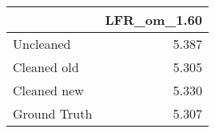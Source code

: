 \begin{tabular}{lr}
\toprule
{} & LFR_om_1.60 \\
\midrule
Uncleaned    &       5.387 \\
Cleaned old  &       5.305 \\
Cleaned new  &       5.330 \\
Ground Truth &       5.307 \\
\bottomrule
\end{tabular}
